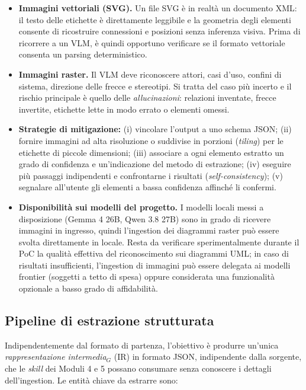 \documentclass[a4paper, 11pt]{article}
\newcommand{\term}[1]{\textit{#1}$_G$} %
\begin{document}
\begin{itemize}
    \item \textbf{Immagini vettoriali (SVG).} Un file SVG è in realtà un documento XML: il testo delle etichette è direttamente leggibile e la geometria degli elementi consente di ricostruire connessioni e posizioni senza inferenza visiva. Prima di ricorrere a un VLM, è quindi opportuno verificare se il formato vettoriale consenta un parsing deterministico.
    \item \textbf{Immagini raster.} Il VLM deve riconoscere attori, casi d'uso, confini di sistema, direzione delle frecce e stereotipi. Si tratta del caso più incerto e il rischio principale è quello delle \textit{allucinazioni}: relazioni inventate, frecce invertite, etichette lette in modo errato o elementi omessi.
    \item \textbf{Strategie di mitigazione:} (i) vincolare l'output a uno schema JSON; (ii) fornire immagini ad alta risoluzione o suddivise in porzioni (\textit{tiling}) per le etichette di piccole dimensioni; (iii) associare a ogni elemento estratto un grado di confidenza e un'indicazione del metodo di estrazione; (iv) eseguire più passaggi indipendenti e confrontarne i risultati (\textit{self-consistency}); (v) segnalare all'utente gli elementi a bassa confidenza affinché li confermi.
    \item \textbf{Disponibilità sui modelli del progetto.} I modelli locali messi a disposizione (Gemma 4 26B, Qwen 3.8 27B) sono in grado di ricevere immagini in ingresso, quindi l'ingestion dei diagrammi raster può essere svolta direttamente in locale. Resta da verificare sperimentalmente durante il PoC la qualità effettiva del riconoscimento sui diagrammi UML; in caso di risultati insufficienti, l'ingestion di immagini può essere delegata ai modelli frontier (soggetti a tetto di spesa) oppure considerata una funzionalità opzionale a basso grado di affidabilità.
\end{itemize}

\subsection{Pipeline di estrazione strutturata}
Indipendentemente dal formato di partenza, l'obiettivo è produrre un'unica \term{rappresentazione intermedia} (IR) in formato JSON, indipendente dalla sorgente, che le \textit{skill} dei Moduli 4 e 5 possano consumare senza conoscere i dettagli dell'ingestion. Le entità chiave da estrarre sono:
\end{document}
